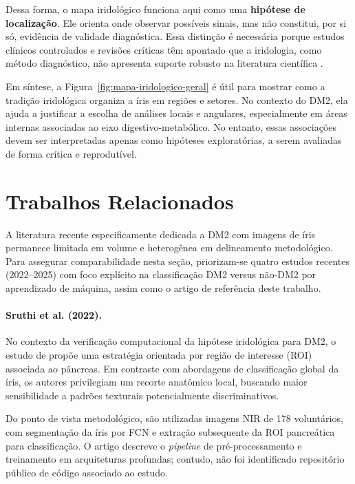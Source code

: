 \documentclass[11pt,a4paper]{article}
\begin{document}
Dessa forma, o mapa iridológico funciona aqui como uma \textbf{hipótese de localização}. Ele orienta onde observar possíveis sinais, mas não constitui, por si só, evidência de validade diagnóstica. Essa distinção é necessária porque estudos clínicos controlados e revisões críticas têm apontado que a iridologia, como método diagnóstico, não apresenta suporte robusto na literatura científica \citep{Simon1979JAMA, Knipschild1988BMJ, Ernst2000ArchOphthalmol}.

Em síntese, a Figura~\ref{fig:mapa-iridologico-geral} é útil para mostrar como a tradição iridológica organiza a íris em regiões e setores. No contexto do DM2, ela ajuda a justificar a escolha de análises locais e angulares, especialmente em áreas internas associadas ao eixo digestivo-metabólico. No entanto, essas associações devem ser interpretadas apenas como hipóteses exploratórias, a serem avaliadas de forma crítica e reprodutível.

\section{Trabalhos Relacionados}

A literatura recente especificamente dedicada a DM2 com imagens de íris permanece limitada em volume e heterogênea em delineamento metodológico. Para assegurar comparabilidade nesta seção, priorizam-se quatro estudos recentes (2022--2025) com foco explícito na classificação DM2 versus não-DM2 por aprendizado de máquina, assim como o artigo de referência deste trabalho.

\paragraph{Sruthi et al. (2022).}
No contexto da verificação computacional da hipótese iridológica para DM2, o estudo de \citet{SruthiEtAl2022IJPRAI} propõe uma estratégia orientada por região de interesse (ROI) associada ao pâncreas. Em contraste com abordagens de classificação global da íris, os autores privilegiam um recorte anatômico local, buscando maior sensibilidade a padrões texturais potencialmente discriminativos.

Do ponto de vista metodológico, são utilizadas imagens NIR de 178 voluntários, com segmentação da íris por FCN e extração subsequente da ROI pancreática para classificação. O artigo descreve o \textit{pipeline} de pré-processamento e treinamento em arquiteturas profundas; contudo, não foi identificado repositório público de código associado ao estudo.
\end{document}
